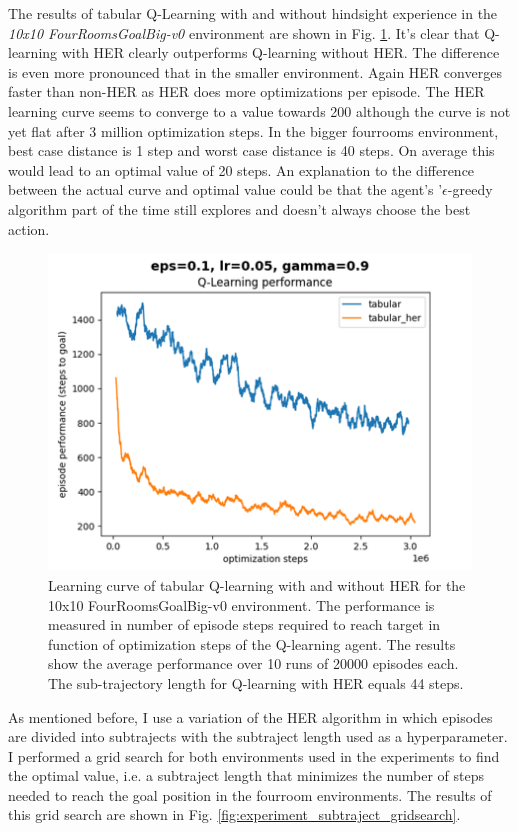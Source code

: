 \documentclass[conference]{IEEEtran}
\begin{document}
The results of tabular Q-Learning with and without hindsight experience in the \textit{10x10 FourRoomsGoalBig-v0} environment are shown in Fig. \ref{fig:experiment_fourroomsgoalbig_learning_performance}. It's clear that Q-learning with HER clearly outperforms Q-learning without HER. The difference is even more pronounced that in the smaller environment. Again HER converges faster than non-HER as HER does more optimizations per episode. The HER learning curve seems to converge to a value towards 200 although the curve is not yet flat after 3 million optimization steps. In the bigger fourrooms environment, best case distance is 1 step and worst case distance is 40 steps. On average this would lead to an optimal value of 20 steps. An explanation to the difference between the actual curve and optimal value could be that the agent's '$\epsilon$-greedy algorithm part of the time still explores and doesn't always choose the best action. 
\begin{figure}[ht]
\centering
\includegraphics[width=0.9\columnwidth]{img/exp_tabular_her_fourroom_big.png}
\caption{Learning curve of tabular Q-learning with and without HER for the 10x10 FourRoomsGoalBig-v0 environment. The performance is measured in number of episode steps required to reach target in function of optimization steps of the Q-learning agent. The results show the average performance over 10 runs of 20000 episodes each. The sub-trajectory length for Q-learning with HER equals 44 steps.}
\label{fig:experiment_fourroomsgoalbig_learning_performance}
\end{figure}

As mentioned before, I use a variation of the HER algorithm in which episodes are divided into subtrajects with the subtraject length used as a hyperparameter. I performed a grid search for both environments used in the experiments to find the optimal value, i.e. a subtraject length that minimizes the number of steps needed to reach the goal position in the fourroom environments. The results of this grid search are shown in Fig. \ref{fig:experiment_subtraject_gridsearch}. 
\end{document}
